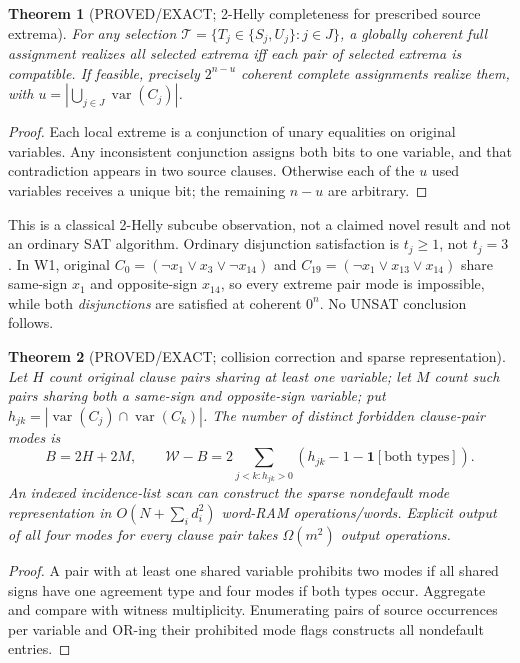 \documentclass[11pt]{article}
\newtheorem{theorem}{Theorem}
\begin{document}
\begin{theorem}[PROVED/EXACT; 2-Helly completeness for prescribed source extrema]
For any selection $\mathcal T=\{T_j\in\{S_j,U_j\}:j\in J\}$, a globally coherent full assignment realizes all selected extrema iff each pair of selected extrema is compatible. If feasible, precisely $2^{n-u}$ coherent complete assignments realize them, with $u=|\bigcup_{j\in J}\operatorname{var}(C_j)|$.
\end{theorem}
\begin{proof}
Each local extreme is a conjunction of unary equalities on original variables. Any inconsistent conjunction assigns both bits to one variable, and that contradiction appears in two source clauses. Otherwise each of the $u$ used variables receives a unique bit; the remaining $n-u$ are arbitrary.
\end{proof}
\noindent This is a classical 2-Helly subcube observation, not a claimed novel result and not an ordinary SAT algorithm. Ordinary disjunction satisfaction is $t_j\ge1$, not $t_j=3$. In W1, original $C_0=(\neg x_1\lor x_3\lor\neg x_{14})$ and $C_{19}=(\neg x_1\lor x_{13}\lor x_{14})$ share same-sign $x_1$ and opposite-sign $x_{14}$, so every extreme pair mode is impossible, while both \emph{disjunctions} are satisfied at coherent $0^n$. No UNSAT conclusion follows.

\begin{theorem}[PROVED/EXACT; collision correction and sparse representation]
Let $H$ count original clause pairs sharing at least one variable; let $M$ count such pairs sharing both a same-sign and opposite-sign variable; put $h_{jk}=|\operatorname{var}(C_j)\cap\operatorname{var}(C_k)|$. The number of \emph{distinct} forbidden clause-pair modes is
\[
B=2H+2M,\qquad \mathcal W-B=2\!\!\sum_{j<k:h_{jk}>0}\!\!(h_{jk}-1-\mathbf1[\text{both types}]).
\]
An indexed incidence-list scan can construct the sparse nondefault mode representation in $O(N+\sum_i d_i^2)$ word-RAM operations/words. Explicit output of all four modes for every clause pair takes $\Omega(m^2)$ output operations.
\end{theorem}
\begin{proof}
A pair with at least one shared variable prohibits two modes if all shared signs have one agreement type and four modes if both types occur. Aggregate and compare with witness multiplicity. Enumerating pairs of source occurrences per variable and OR-ing their prohibited mode flags constructs all nondefault entries.
\end{proof}
\end{document}
